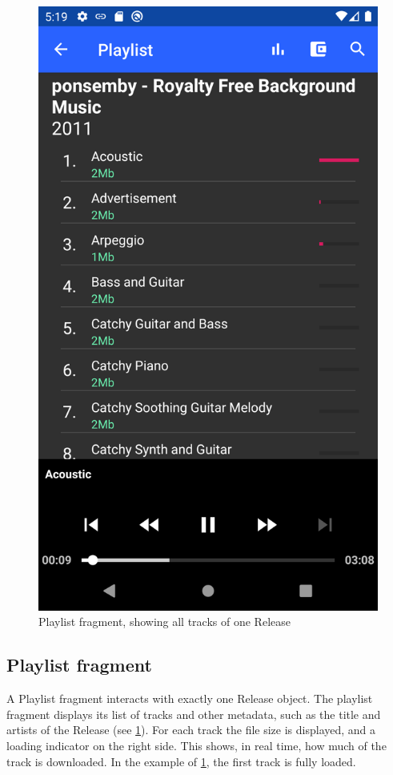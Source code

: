 \begin{figure}
        \includegraphics[width=1\linewidth]{implementation/screenshot-playlist.png}
        \caption{Playlist fragment, showing all tracks of one Release}
        \label{fig:screenshot-playlist}
    \endminipage\hfill
\end{figure}
\subsection{Playlist fragment}
A Playlist fragment interacts with exactly one Release object. The playlist fragment displays its list of tracks and other metadata, such as the title and artists of the Release (see \ref{fig:screenshot-playlist}). For each track the file size is displayed, and a loading indicator on the right side. This shows, in real time, how much of the track is downloaded. In the example of \ref{fig:screenshot-playlist}, the first track is fully loaded.
